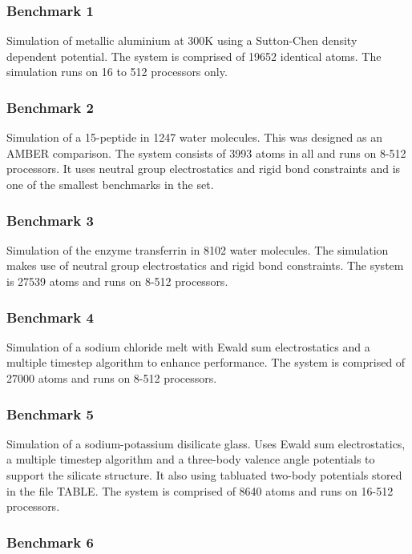 \subsubsection{Benchmark 1}

Simulation of metallic aluminium at 300K using a Sutton-Chen density
dependent potential. The system is comprised of 19652 identical atoms.
The simulation runs on 16 to 512 processors only. 

\subsubsection{Benchmark 2}

Simulation of a 15-peptide in 1247 water molecules. This was designed
as an AMBER comparison. The system consists of 3993 atoms in all and
runs on 8-512 processors. It uses neutral group electrostatics and
rigid bond constraints and is one of the smallest benchmarks in the
set.

\subsubsection{Benchmark 3}

Simulation of the enzyme transferrin in 8102 water molecules. The
simulation makes use of neutral group electrostatics and rigid bond
constraints.  The system is 27539 atoms and runs on 8-512 processors.

\subsubsection{Benchmark 4}

Simulation of a sodium chloride melt with Ewald sum electrostatics and
a multiple timestep algorithm to enhance performance. The system is
comprised of 27000 atoms and runs on 8-512 processors.

\subsubsection{Benchmark 5}

Simulation of a sodium-potassium disilicate glass. Uses Ewald sum
electrostatics, a multiple timestep algorithm and a three-body valence
angle potentials to support the silicate structure. It also using
tabluated two-body potentials stored in the file TABLE. The system is
comprised of 8640 atoms and runs on 16-512 processors.

\subsubsection{Benchmark 6}

